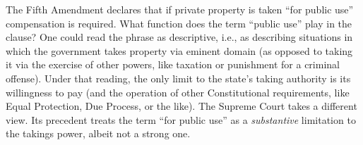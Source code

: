 The Fifth Amendment declares that if private property is taken ``for public
use'' compensation is required. What function does the term ``public use'' play
in the clause? One could read the phrase as descriptive, i.e., as describing
situations in which the government takes property via eminent domain (as opposed
to taking it via the exercise of other powers, like taxation or punishment for a
criminal offense). Under that reading, the only limit to the state's taking
authority is its willingness to pay (and the operation of other Constitutional
requirements, like Equal Protection, Due Process, or the like). The Supreme
Court takes a different view. Its precedent treats the term ``for public use''
as a \textit{substantive} limitation to the takings power, albeit not a strong
one. 

